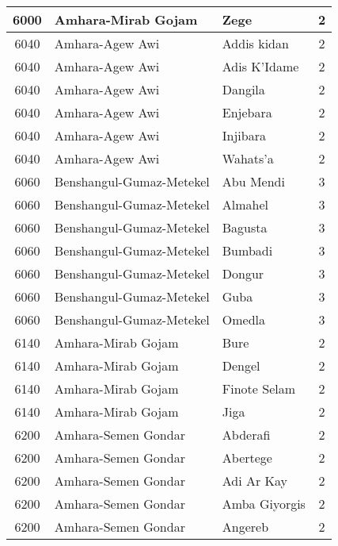 \documentclass[12pt,a4paper]{report}
\begin{document}
\begin{tabular}{|c|l|l|c|}
\hline 
\rule[-1ex]{0pt}{2.5ex} 6000 & Amhara-Mirab Gojam & Zege & 2 \\
\hline 
\rule[-1ex]{0pt}{2.5ex} 6040 & Amhara-Agew Awi & Addis kidan & 2 \\
\hline 
\rule[-1ex]{0pt}{2.5ex} 6040 & Amhara-Agew Awi & Adis K'Idame & 2 \\
\hline 
\rule[-1ex]{0pt}{2.5ex} 6040 & Amhara-Agew Awi & Dangila & 2 \\
\hline 
\rule[-1ex]{0pt}{2.5ex} 6040 & Amhara-Agew Awi & Enjebara & 2 \\
\hline 
\rule[-1ex]{0pt}{2.5ex} 6040 & Amhara-Agew Awi & Injibara & 2 \\
\hline 
\rule[-1ex]{0pt}{2.5ex} 6040 & Amhara-Agew Awi & Wahats'a & 2 \\
\hline 
\rule[-1ex]{0pt}{2.5ex} 6060 & Benshangul-Gumaz-Metekel & Abu Mendi & 3 \\
\hline 
\rule[-1ex]{0pt}{2.5ex} 6060 & Benshangul-Gumaz-Metekel & Almahel & 3 \\
\hline 
\rule[-1ex]{0pt}{2.5ex} 6060 & Benshangul-Gumaz-Metekel & Bagusta & 3 \\
\hline 
\rule[-1ex]{0pt}{2.5ex} 6060 & Benshangul-Gumaz-Metekel & Bumbadi & 3 \\
\hline 
\rule[-1ex]{0pt}{2.5ex} 6060 & Benshangul-Gumaz-Metekel & Dongur & 3 \\
\hline 
\rule[-1ex]{0pt}{2.5ex} 6060 & Benshangul-Gumaz-Metekel & Guba & 3 \\
\hline 
\rule[-1ex]{0pt}{2.5ex} 6060 & Benshangul-Gumaz-Metekel & Omedla & 3 \\
\hline 
\rule[-1ex]{0pt}{2.5ex} 6140 & Amhara-Mirab Gojam & Bure & 2 \\
\hline 
\rule[-1ex]{0pt}{2.5ex} 6140 & Amhara-Mirab Gojam & Dengel & 2 \\
\hline 
\rule[-1ex]{0pt}{2.5ex} 6140 & Amhara-Mirab Gojam & Finote Selam & 2 \\
\hline 
\rule[-1ex]{0pt}{2.5ex} 6140 & Amhara-Mirab Gojam & Jiga & 2 \\
\hline 
\rule[-1ex]{0pt}{2.5ex} 6200 & Amhara-Semen Gondar & Abderafi & 2 \\
\hline 
\rule[-1ex]{0pt}{2.5ex} 6200 & Amhara-Semen Gondar & Abertege & 2 \\
\hline 
\rule[-1ex]{0pt}{2.5ex} 6200 & Amhara-Semen Gondar & Adi Ar Kay & 2 \\
\hline 
\rule[-1ex]{0pt}{2.5ex} 6200 & Amhara-Semen Gondar & Amba Giyorgis & 2 \\
\hline 
\rule[-1ex]{0pt}{2.5ex} 6200 & Amhara-Semen Gondar & Angereb & 2 \\

\end{tabular}
\end{document}
